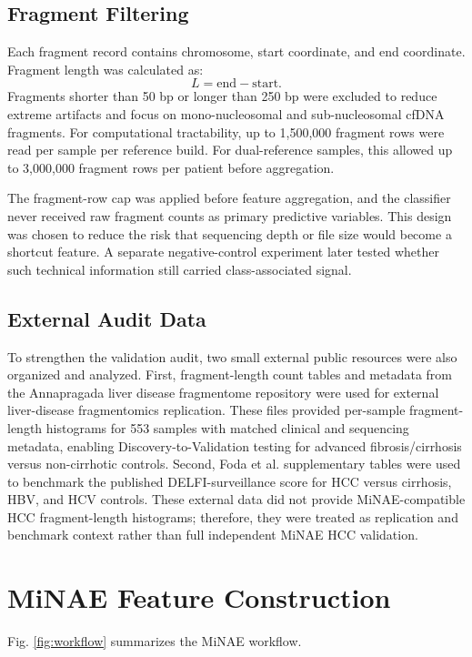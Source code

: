 \documentclass[conference]{IEEEtran}
\begin{document}
\subsection{Fragment Filtering}
Each fragment record contains chromosome, start coordinate, and end coordinate. Fragment length was calculated as:
\begin{equation}
    L = \mathrm{end} - \mathrm{start}.
\end{equation}
Fragments shorter than 50 bp or longer than 250 bp were excluded to reduce extreme artifacts and focus on mono-nucleosomal and sub-nucleosomal cfDNA fragments. For computational tractability, up to 1,500,000 fragment rows were read per sample per reference build. For dual-reference samples, this allowed up to 3,000,000 fragment rows per patient before aggregation.

The fragment-row cap was applied before feature aggregation, and the classifier never received raw fragment counts as primary predictive variables. This design was chosen to reduce the risk that sequencing depth or file size would become a shortcut feature. A separate negative-control experiment later tested whether such technical information still carried class-associated signal.

\subsection{External Audit Data}
To strengthen the validation audit, two small external public resources were also organized and analyzed. First, fragment-length count tables and metadata from the Annapragada liver disease fragmentome repository were used for external liver-disease fragmentomics replication. These files provided per-sample fragment-length histograms for 553 samples with matched clinical and sequencing metadata, enabling Discovery-to-Validation testing for advanced fibrosis/cirrhosis versus non-cirrhotic controls. Second, Foda et al. supplementary tables were used to benchmark the published DELFI-surveillance score for HCC versus cirrhosis, HBV, and HCV controls. These external data did not provide MiNAE-compatible HCC fragment-length histograms; therefore, they were treated as replication and benchmark context rather than full independent MiNAE HCC validation.

\section{MiNAE Feature Construction}
Fig. \ref{fig:workflow} summarizes the MiNAE workflow.
\end{document}
